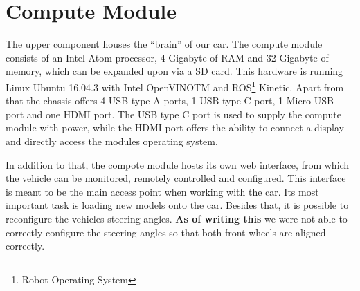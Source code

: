 \section{Compute Module}
The upper component houses the ``brain'' of our car. The compute module consists of an Intel Atom
processor, 4 Gigabyte of RAM and 32 Gigabyte of memory, which can be expanded upon via a SD card. This hardware is running Linux Ubuntu 16.04.3 with Intel OpenVINO\textsc{T}\textsc{M} and ROS\footnote{Robot Operating System} Kinetic. Apart from that the chassis offers 4 USB type A ports, 1 USB type C port, 1 Micro-USB port and one HDMI port. The USB type C port is used to supply the compute module with power, while the HDMI port offers the ability to connect a display and directly access the modules operating system.

In addition to that, the compote module hosts its own web interface, from which the vehicle can be monitored, remotely controlled and configured. This interface is meant to be the main access point when working with the car. Its most important task is loading new models onto the car. Besides that, it is possible to reconfigure the vehicles steering angles. \textbf{As of writing this} we were not able to correctly configure the steering angles so that both front wheels are aligned correctly.
